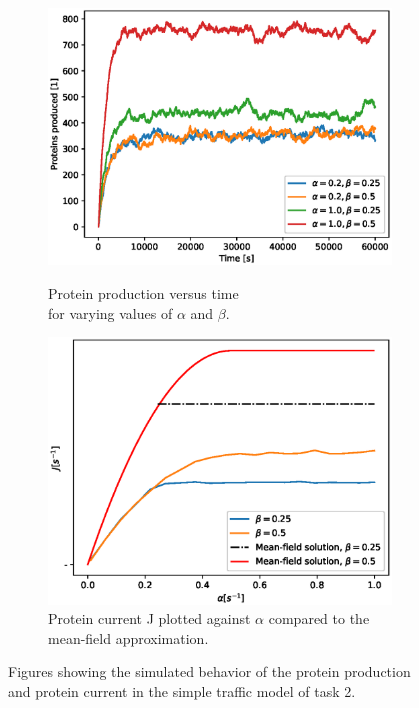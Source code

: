 \documentclass{article}
\begin{document}
\begin{figure}[H]
	\centering
	\begin{subfigure}[b]{.49\textwidth}
		\centering
		\includegraphics[width = \linewidth]{figs/task2_prot_prod_v4.eps}
		\label{fig:task2_prot_prod}
		\caption{Protein production versus time \\for varying values of $\alpha$ and $\beta$.}
	\end{subfigure}
	\begin{subfigure}[b]{.49\textwidth} 
		\centering
		\includegraphics[width = \linewidth]{figs/task2_meanfield_v6.eps}
		\caption{Protein current J plotted against $\alpha$ compared to the mean-field approximation.}
		\label{fig:task2_mean-field}
	\end{subfigure}
	\label{fig:task2}
	\caption{Figures showing the simulated behavior of the protein production and protein current in the simple traffic model of task 2.}
\end{figure}
\end{document}
